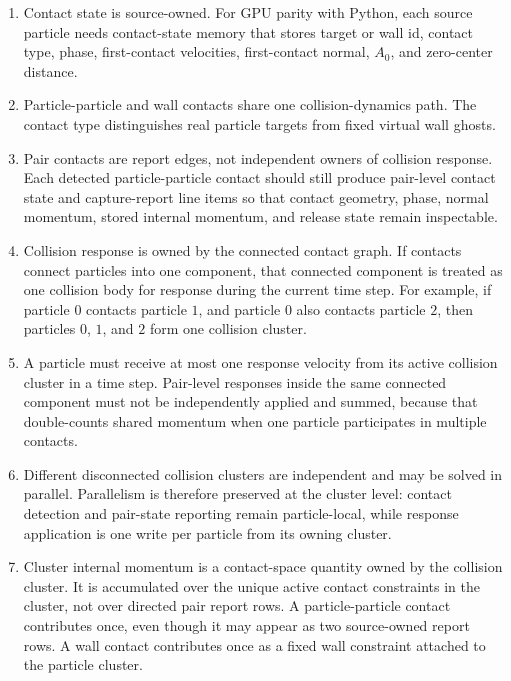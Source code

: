 \begin{enumerate}
    \item Contact state is source-owned. For GPU parity with Python, each source particle needs contact-state memory that stores target or wall id, contact type, phase, first-contact velocities, first-contact normal, \(A_0\), and zero-center distance.

    \item Particle-particle and wall contacts share one collision-dynamics path. The contact type distinguishes real particle targets from fixed virtual wall ghosts.

    \item Pair contacts are report edges, not independent owners of collision response. Each detected particle-particle contact should still produce pair-level contact state and capture-report line items so that contact geometry, phase, normal momentum, stored internal momentum, and release state remain inspectable.

    \item Collision response is owned by the connected contact graph. If contacts connect particles into one component, that connected component is treated as one collision body for response during the current time step. For example, if particle \(0\) contacts particle \(1\), and particle \(0\) also contacts particle \(2\), then particles \(0\), \(1\), and \(2\) form one collision cluster.

    \item A particle must receive at most one response velocity from its active collision cluster in a time step. Pair-level responses inside the same connected component must not be independently applied and summed, because that double-counts shared momentum when one particle participates in multiple contacts.

    \item Different disconnected collision clusters are independent and may be solved in parallel. Parallelism is therefore preserved at the cluster level: contact detection and pair-state reporting remain particle-local, while response application is one write per particle from its owning cluster.

    \item Cluster internal momentum is a contact-space quantity owned by the collision cluster. It is accumulated over the unique active contact constraints in the cluster, not over directed pair report rows. A particle-particle contact contributes once, even though it may appear as two source-owned report rows. A wall contact contributes once as a fixed wall constraint attached to the particle cluster.


\end{enumerate}
